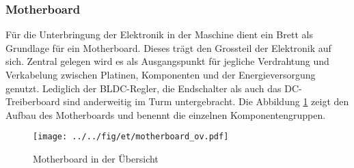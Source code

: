 \subsubsection{Motherboard}
Für die Unterbringung der Elektronik in der Maschine dient ein Brett
als Grundlage für ein Motherboard. Dieses trägt den Grossteil der
Elektronik auf sich. Zentral gelegen wird es als Ausgangspunkt für
jegliche Verdrahtung und Verkabelung zwischen Platinen, Komponenten und der
Energieversorgung genutzt. Lediglich der BLDC-Regler, die Endschalter 
als auch das DC-Treiberboard sind anderweitig im Turm untergebracht.
Die Abbildung \ref{fig:motherboard_pcb} zeigt den Aufbau des Motherboards
und benennt die einzelnen Komponentengruppen.

\begin{figure}[h!]
	\centering
	\texttt{[image: ../../fig/et/motherboard\_ov.pdf]}
	\caption{Motherboard in der Übersicht}
	\label{fig:motherboard_pcb}
\end{figure}